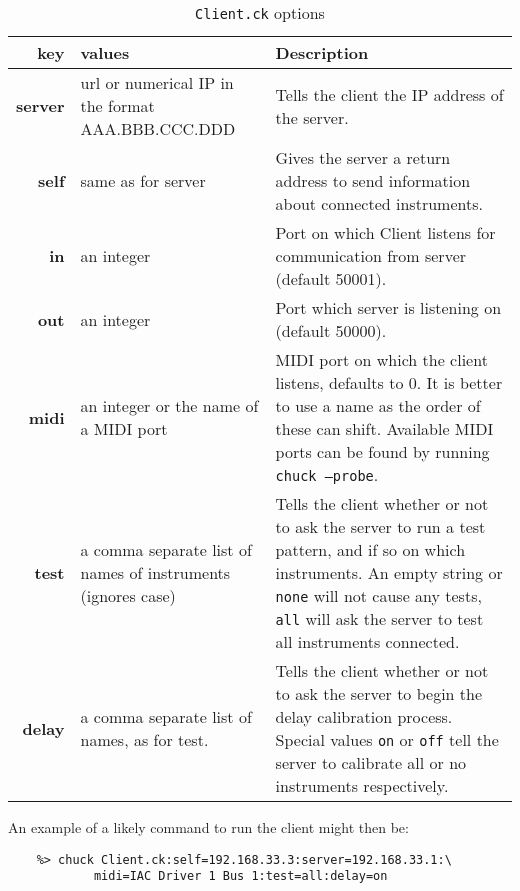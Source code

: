 \documentclass[11pt]{article}
\begin{document}
\begin{table} [ht]
\caption {\texttt{Client.ck} options}
\label{tab:clientopts}
\begin{tabularx} {\textwidth} { | >{\bfseries}r | X | X |}
\hline
key			& values											& Description \\
\hline \hline
server		& url or numerical IP in the format AAA.BBB.CCC.DDD & Tells the client the IP address of the server. \\
\hline
self			& same as for server							    & Gives the server a return address to send information about connected instruments. \\
\hline
in 			& an integer								    & Port on which Client listens for communication from server (default 50001). \\
\hline
out		         & an integer								    & Port which server is listening on (default 50000). \\
\hline
midi			& an integer or the name of a MIDI port			    & MIDI port on which the client listens, defaults to 0. It is better to use a name as the order
														of these can shift. Available MIDI ports can be found by running \texttt{chuck --probe}. \\
\hline
test			& a comma separate list of names of instruments (ignores case) & Tells the client whether or not to ask the server to run a test pattern, and if so on
														which instruments. An empty string or \texttt{none} will not cause any tests, \texttt{all} will
														ask the server to test all instruments connected. \\
\hline
delay		& a comma separate list of names, as for test. 		    & Tells the client whether or not to ask the server to begin the delay calibration process. 
														Special values \texttt{on} or \texttt{off} tell the server to calibrate all or no instruments
														respectively. \\
\hline
\end{tabularx}

\end{table}

An example of a likely command to run the client might then be:
\begin{verbatim}
	%> chuck Client.ck:self=192.168.33.3:server=192.168.33.1:\
			midi=IAC Driver 1 Bus 1:test=all:delay=on
\end{verbatim}

\newpage
\end{document}
